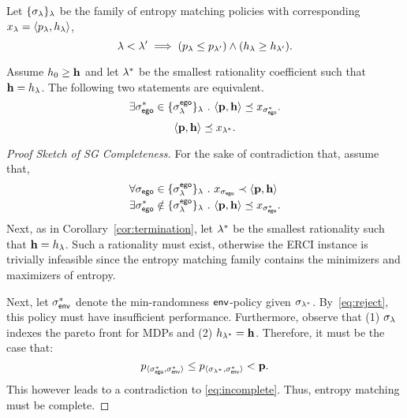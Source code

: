 \begin{lemma}
  Let $\{\sigma_\lambda\}_\lambda$ be the family of entropy matching policies
  with corresponding $x_\lambda = \langle p_\lambda, h_\lambda\rangle$,
  \begin{equation}
  \lambda < \lambda' \implies (p_{\lambda} \leq p_{\lambda'}) \wedge (h_\lambda \geq h_{\lambda'}).
  \end{equation}
\end{lemma}
\begin{corollary}\label{cor:termination}
  Assume $h_0 \geq \mathbf{h}$ and
  let $\lambda^*$ be the smallest rationality coefficient such that $\mathbf{h} = h_\lambda$.
  The following two statements are equivalent.
  \begin{equation}
       \exists \sigma_{\mathsf{ego}}^* \in \{\sigma^{\mathsf{ego}}_\lambda\}_\lambda~.~  \langle \mathbf{p}, \mathbf{h} \rangle \preceq x_{\sigma_{\mathsf{ego}}^*}.
  \end{equation}
  \begin{equation}
    \langle \mathbf{p}, \mathbf{h} \rangle \preceq x_{\lambda^*}.
  \end{equation}
\end{corollary}
\begin{proof}[Proof Sketch of SG Completeness]
  For the sake of contradiction that, assume that,
  \begin{align}
    &\forall \sched_\pOne \in \{\sched^{\pOne}_\rat\}_\rat~.~ x_{\sched_{\pOne}} \prec \langle \scthreshold, \randomness \rangle\label{eq:reject}\\
    &\exists \sched_\pOne^* \notin \{\sched^{\pOne}_\rat\}_\rat~.~  \langle \scthreshold, \randomness \rangle \preceq x_{\sched_{\pOne}^*}\label{eq:incomplete}.
  \end{align}
  Next, as in Corollary~\ref{cor:termination}, let $\lambda^*$ be the smallest
  rationality such that $\mathbf{h} = h_\lambda$. Such a rationality must
  exist, otherwise the ERCI instance is trivially infeasible since the
  entropy matching family contains the minimizers and maximizers of entropy.


  Next, let
  $\sigma_{\mathsf{env}}^*$ denote the min-randomness $\mathsf{env}$-policy given
  $\sigma_{\lambda^*}$. By~\eqref{eq:reject}, this policy must have
  insufficient performance.
  Furthermore, observe that  (1) $\sigma_\lambda$ indexes the pareto front for MDPs and (2) $h_{\lambda^*} = \mathbf{h}$. Therefore, it must be
  the case that:
  \begin{equation}
    p_{\langle \sigma_{\mathsf{ego}}^*, \sigma_{\mathsf{env}}^* \rangle} \leq p_{\langle \sigma_{\lambda^*}, \sigma_{\mathsf{env}}^* \rangle} < \mathbf{p}.
  \end{equation}
  This however leads to a contradiction to \eqref{eq:incomplete}.  Thus,
  entropy matching must be complete.
\end{proof}

